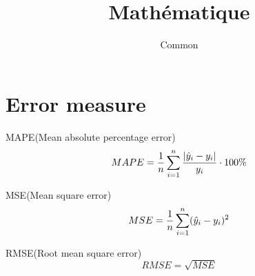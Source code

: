 \documentclass{article}
\begin{document}
\title{Math\'ematique}
\author{Common}
\maketitle
\tableofcontents
\newpage
\section{Error measure}
MAPE(Mean absolute percentage error)
$$ MAPE = \dfrac{1}{n} \sum_{i=1}^n \dfrac{|\hat{y}_i - y_i|}{y_i} \cdot 100\%$$

MSE(Mean square error)
$$MSE = \dfrac{1}{n} \sum_{i=1}^n (\hat{y}_i - y_i)^2$$

RMSE(Root mean square error)
$$RMSE  = \sqrt{MSE}$$
\end{document}
